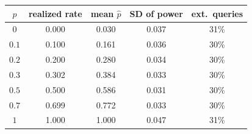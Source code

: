 \setlength{\tabcolsep}{3pt}
\begin{tabular}{ccccc}
\toprule
$p$ & realized rate & mean $\hat p$ & SD of power & ext.\ queries \\
\midrule
$0$ & 0.000 & 0.030 & 0.037 & 31\% \\
$0.1$ & 0.100 & 0.161 & 0.036 & 30\% \\
$0.2$ & 0.200 & 0.280 & 0.034 & 30\% \\
$0.3$ & 0.302 & 0.384 & 0.033 & 30\% \\
$0.5$ & 0.500 & 0.586 & 0.031 & 30\% \\
$0.7$ & 0.699 & 0.772 & 0.033 & 30\% \\
$1$ & 1.000 & 1.000 & 0.047 & 31\% \\
\bottomrule
\end{tabular}
